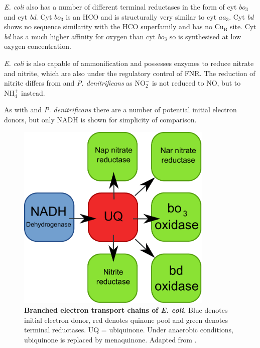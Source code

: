 \textit{E. coli} also has a number of different terminal reductases in the form of cyt $bo_3$ and cyt \textit{bd}. Cyt $bo_3$ is an HCO and is structurally very similar to cyt $aa_3$. Cyt \textit{bd} shows no sequence similarity with the HCO superfamily and has no $\mathrm{Cu}_\mathrm{B}$ site. Cyt \textit{bd} has a much higher affinity for oxygen than cyt $bo_3$ so is synthesised at low oxygen concentration.

\textit{E. coli} is also capable of ammonification and possesses enzymes to reduce nitrate and nitrite, which are also under the regulatory control of FNR. The reduction of nitrite differs from \Nm{} and \textit{P. denitrificans} as $\mathrm{NO}_2^-$ is not reduced to NO, but to $\mathrm{NH}_4^+$ instead.

As with \Nm{} and \textit{P. denitrificans} there are a number of potential initial electron donors, but only NADH is shown for simplicity of comparison.

\begin{figure}[tbp]
\begin{center}
	\includegraphics[height=9cm]{01-introduction/data/e_coli_resp.pdf}
	\caption[{Branched electron transport chains of \textit{E. coli}.}]{{\bf Branched electron transport chains of \textit{E. coli}.} Blue denotes initial electron donor, red denotes quinone pool and green denotes terminal reductases. UQ = ubiquinone. Under anaerobic conditions, ubiquinone is replaced by menaquinone. Adapted from \citet{Nicholls1992}.
	\label{fig:e_coli_resp}}
\end{center}
\end{figure}

